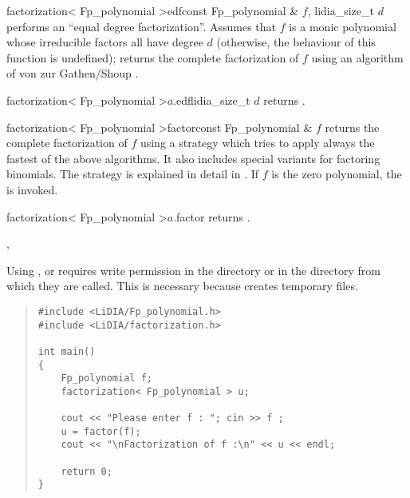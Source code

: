 \begin{fcode}{factorization< Fp_polynomial >}{edf}{const Fp_polynomial & $f$, lidia_size_t $d$}
  performs an ``equal degree factorization''.  Assumes that $f$ is a monic polynomial whose
  irreducible factors all have degree $d$ (otherwise, the behaviour of this function is
  undefined); returns the complete factorization of $f$ using an algorithm of von zur
  Gathen/Shoup \cite{vzGathen/Shoup:1992}.
\end{fcode}

\begin{cfcode}{factorization< Fp_polynomial >}{$a$.edf}{lidia_size_t $d$}
  returns .
\end{cfcode}



\begin{fcode}{factorization< Fp_polynomial >}{factor}{const Fp_polynomial & $f$}
  returns the complete factorization of $f$ using a strategy which tries to apply always the
  fastest of the above algorithms.  It also includes special variants for factoring binomials.
  The strategy is explained in detail in \cite{Pfahler_Thesis:1998}.  If $f$ is the zero
  polynomial, the \LEH is invoked.
\end{fcode}

\begin{cfcode}{factorization< Fp_polynomial >}{$a$.factor}{}
  returns .
\end{cfcode}



\SEEALSO

, 



\WARNINGS

Using ,  or  requires write permission in the
 directory or in the directory from which they are called.  This is necessary because
 creates temporary files.



\EXAMPLES

\begin{quote}
\begin{verbatim}
#include <LiDIA/Fp_polynomial.h>
#include <LiDIA/factorization.h>

int main()
{
    Fp_polynomial f;
    factorization< Fp_polynomial > u;

    cout << "Please enter f : "; cin >> f ;
    u = factor(f);
    cout << "\nFactorization of f :\n" << u << endl;

    return 0;
}
\end{verbatim}
\end{quote}

